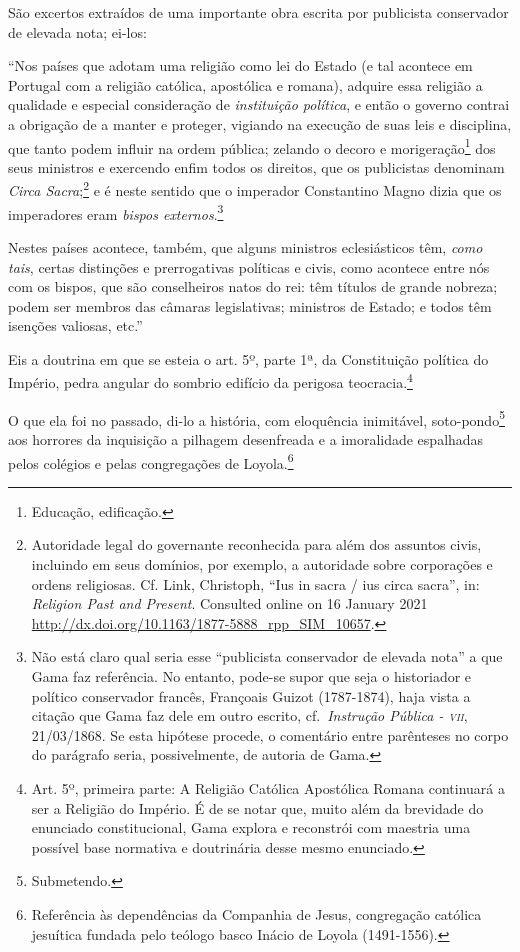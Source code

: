 São excertos extraídos de uma importante obra escrita por publicista
conservador de elevada nota; ei-los:

``Nos países que adotam uma religião como lei do Estado (e tal acontece
em Portugal com a religião católica, apostólica e romana), adquire essa
religião a qualidade e especial consideração de \emph{instituição
política}, e então o governo contrai a obrigação de a manter e proteger,
vigiando na execução de suas leis e disciplina, que tanto podem influir
na ordem pública; zelando o decoro e morigeração\footnote{Educação,
  edificação.} dos seus ministros e exercendo enfim todos os direitos,
que os publicistas denominam \emph{Circa Sacra};\footnote{Autoridade
  legal do governante reconhecida para além dos assuntos civis,
  incluindo em seus domínios, por exemplo, a autoridade sobre
  corporações e ordens religiosas. Cf. Link, Christoph, ``Ius in sacra /
  ius circa sacra'', in: \emph{Religion Past and Present}. Consulted
  online on 16 January 2021
  \url{http://dx.doi.org/10.1163/1877-5888_rpp_SIM_10657}.} e é neste
sentido que o imperador Constantino Magno dizia que os imperadores eram
\emph{bispos externos}.\footnote{Não está claro qual seria esse
  ``publicista conservador de elevada nota'' a que Gama faz referência. No
  entanto, pode-se supor que seja o historiador e político conservador
  francês, Françoais Guizot (1787-1874), haja vista a citação que Gama
  faz dele em outro escrito, cf.~\emph{Instrução Pública - \textsc{vii}},
  21/03/1868. Se esta hipótese procede, o comentário entre parênteses no
  corpo do parágrafo seria, possivelmente, de autoria de Gama.}

Nestes países acontece, também, que alguns ministros eclesiásticos têm,
\emph{como tais}, certas distinções e prerrogativas políticas e civis,
como acontece entre nós com os bispos, que são conselheiros natos do
rei: têm títulos de grande nobreza; podem ser membros das câmaras
legislativas; ministros de Estado; e todos têm isenções valiosas, etc.''

Eis a doutrina em que se esteia o art. 5º, parte 1ª, da Constituição
política do Império, pedra angular do sombrio edifício da perigosa
teocracia.\footnote{Art. 5º, primeira parte: A Religião Católica
  Apostólica Romana continuará a ser a Religião do Império. É de se
  notar que, muito além da brevidade do enunciado constitucional, Gama
  explora e reconstrói com maestria uma possível base normativa e
  doutrinária desse mesmo enunciado.}

O que ela foi no passado, di-lo a história, com eloquência inimitável,
soto-pondo\footnote{Submetendo.} aos horrores da inquisição a pilhagem
desenfreada e a imoralidade espalhadas pelos colégios e pelas
congregações de Loyola.\footnote{Referência às dependências da
  Companhia de Jesus, congregação católica jesuítica fundada pelo
  teólogo basco Inácio de Loyola (1491-1556).}

